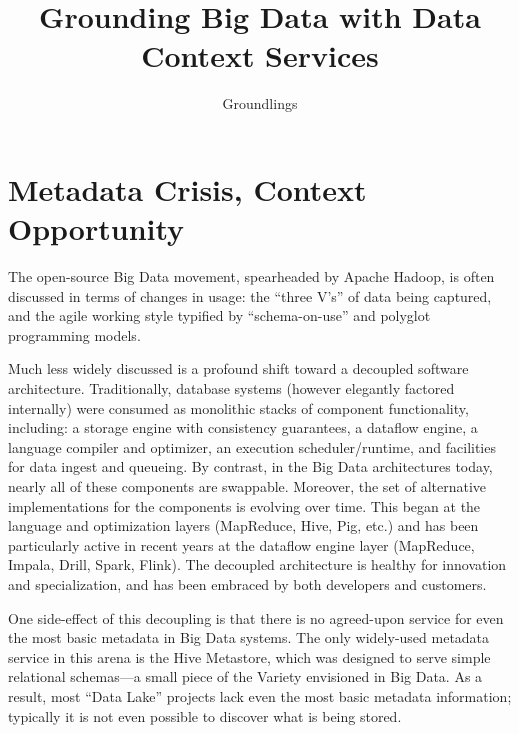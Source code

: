 \documentclass{sig-alternate}
\begin{document}

\title{Grounding Big Data with Data Context Services}
\author{
Groundlings
}

\maketitle

\section{Metadata Crisis, Context Opportunity}
The open-source Big Data movement, spearheaded by Apache Hadoop, is often discussed in terms of changes in usage: the ``three V's'' of data being captured, and the agile working style typified by ``schema-on-use'' and polyglot programming models.

Much less widely discussed is a profound shift toward a decoupled software architecture. Traditionally, database systems (however elegantly factored internally) were consumed as monolithic stacks of component functionality, including: a storage engine with consistency guarantees, a dataflow engine, a language compiler and optimizer, an execution scheduler/runtime, and facilities for data ingest and queueing.  By contrast, in the Big Data architectures today, nearly all of these components are swappable. Moreover, the set of alternative implementations for the components is evolving over time. This began at the language and optimization layers (MapReduce, Hive, Pig, etc.) and has been particularly active in recent years at the dataflow engine layer (MapReduce, Impala, Drill, Spark, Flink). The decoupled architecture is healthy for innovation and specialization, and has been embraced by both developers and customers.

One side-effect of this decoupling is that there is no agreed-upon service for even the most basic metadata in Big Data systems. The only widely-used metadata service in this arena is the Hive Metastore, which was designed to serve simple relational schemas---a small piece of the Variety envisioned in Big Data. As a result, most ``Data Lake'' projects lack even the most basic metadata information; typically it is not even possible to discover what is being stored. 
\end{document}
